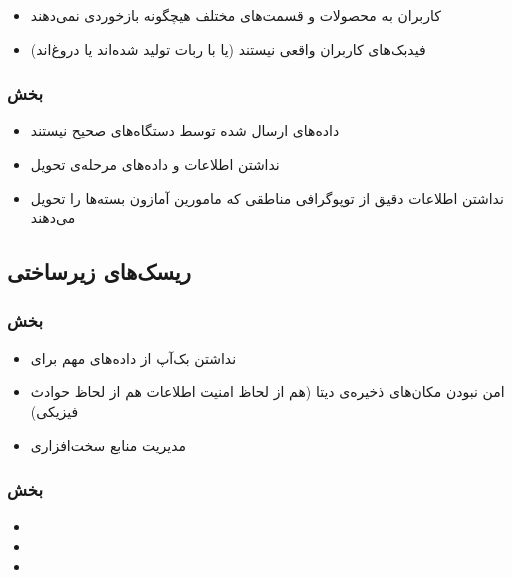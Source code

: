 \begin{itemize}
\item[\risk]
کاربران به محصولات و قسمت‌‌های مختلف هیچگونه بازخوردی نمی‌دهند
\item[\risk]
فید‌بک‌های کاربران واقعی نیستند (یا با ربات تولید شده‌اند یا دروغ‌اند)
\end{itemize}

\subsubsection{بخش }
\begin{itemize}
\item[\risk]
داده‌های ارسال شده توسط دستگاه‌های 
صحیح نیستند
\item[\risk]
نداشتن اطلاعات و داده‌های مرحله‌ی تحویل
\item[\risk] 
نداشتن اطلاعات دقیق از توپوگرافی مناطقی که مامورین آمازون بسته‌ها را تحویل می‌دهند
\end{itemize}

\subsection{ریسک‌های زیرساختی}
\subsubsection{بخش }
\begin{itemize}
\item[\risk]
نداشتن بک‌آپ از داده‌های مهم برای 

\item[\risk]
امن نبودن مکان‌های ذخیره‌ی دیتا (هم از لحاظ‌ امنیت اطلاعات هم از لحاظ حوادث فیزیکی)
\item[\risk]
مدیریت منابع سخت‌افزاری
\end{itemize}

\subsubsection{بخش }
\begin{itemize}
\item[\risk]

\item[\risk]

\item[\risk]
 
\end{itemize}

